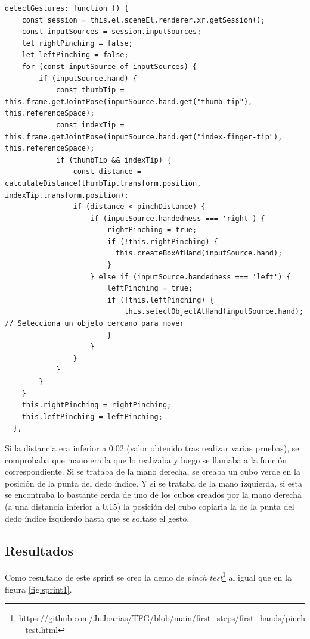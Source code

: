 \documentclass[a4paper, 12pt]{book}
\begin{document}
\begin{lstlisting}[caption=Función detectGestures, captionpos=b, label=lst:firstdetectGesture]
  detectGestures: function () {
    const session = this.el.sceneEl.renderer.xr.getSession();
    const inputSources = session.inputSources;
    let rightPinching = false;
    let leftPinching = false;
    for (const inputSource of inputSources) {
        if (inputSource.hand) {
            const thumbTip = this.frame.getJointPose(inputSource.hand.get("thumb-tip"), this.referenceSpace);
            const indexTip = this.frame.getJointPose(inputSource.hand.get("index-finger-tip"), this.referenceSpace);
            if (thumbTip && indexTip) {
                const distance = calculateDistance(thumbTip.transform.position, indexTip.transform.position);
                if (distance < pinchDistance) {
                    if (inputSource.handedness === 'right') {
                        rightPinching = true;
                        if (!this.rightPinching) {
                          this.createBoxAtHand(inputSource.hand);  
                        }
                    } else if (inputSource.handedness === 'left') {
                        leftPinching = true;
                        if (!this.leftPinching) {
                            this.selectObjectAtHand(inputSource.hand); // Selecciona un objeto cercano para mover
                        }
                    }
                }
            }
        }
    }
    this.rightPinching = rightPinching;
    this.leftPinching = leftPinching;
  },
\end{lstlisting}

Si la distancia era inferior a 0.02 (valor obtenido tras realizar varias pruebas), se comprobaba que mano era la que lo realizaba y luego se llamaba a la función correspondiente. 
Si se trataba de la mano derecha, se creaba un cubo verde en la posición de la punta del dedo índice. Y si se trataba de la mano izquierda, si esta se encontraba lo bastante cerda de uno de los cubos creados por la mano derecha (a una distancia inferior a 0.15) la posición del cubo copiaria la de la punta del dedo índice izquierdo hasta que se soltase el gesto.


\subsection{Resultados}
\label{subsec:resultados1}

Como resultado de este sprint se creo la demo de \textit{pinch test}\footnote{\url{https://github.com/JuJoarias/TFG/blob/main/first_steps/first_hands/pinch_test.html}} al igual que en la figura \ref{fig:sprint1}.
\end{document}
